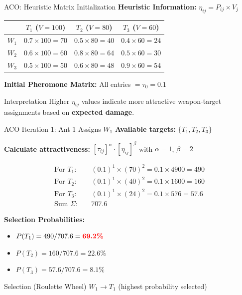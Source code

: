 \documentclass[aspectratio=43,8pt]{beamer}
\begin{document}
\begin{frame}{ACO: Heuristic Matrix Initialization}
\textbf{Heuristic Information:} $\eta_{ij} = P_{ij} \times V_j$

\vspace{0.3cm}
\begin{table}[h]
\centering
\begin{tabular}{c|ccc}
\toprule
& $T_1$ ($V=100$) & $T_2$ ($V=80$) & $T_3$ ($V=60$) \\
\midrule
$W_1$ & $0.7 \times 100 = 70$ & $0.5 \times 80 = 40$ & $0.4 \times 60 = 24$ \\
$W_2$ & $0.6 \times 100 = 60$ & $0.8 \times 80 = 64$ & $0.5 \times 60 = 30$ \\
$W_3$ & $0.5 \times 100 = 50$ & $0.6 \times 80 = 48$ & $0.9 \times 60 = 54$ \\
\bottomrule
\end{tabular}
\end{table}

\vspace{0.3cm}
\textbf{Initial Pheromone Matrix:} All entries $= \tau_0 = 0.1$

\begin{exampleblock}{Interpretation}
Higher $\eta_{ij}$ values indicate more attractive weapon-target assignments based on \textbf{expected damage}.
\end{exampleblock}
\end{frame}

\begin{frame}{ACO Iteration 1: Ant 1 Assigns $W_1$}
\textbf{Available targets:} $\{T_1, T_2, T_3\}$

\vspace{0.2cm}
\textbf{Calculate attractiveness:} $[\tau_{ij}]^\alpha \cdot [\eta_{ij}]^\beta$ with $\alpha=1$, $\beta=2$

\begin{align*}
\text{For } T_1: & \quad (0.1)^1 \times (70)^2 = 0.1 \times 4900 = 490 \\
\text{For } T_2: & \quad (0.1)^1 \times (40)^2 = 0.1 \times 1600 = 160 \\
\text{For } T_3: & \quad (0.1)^1 \times (24)^2 = 0.1 \times 576 = 57.6 \\
\text{Sum } \Sigma: & \quad 707.6
\end{align*}

\textbf{Selection Probabilities:}
\begin{itemize}
    \item $P(T_1) = 490/707.6 = \textcolor{red}{\textbf{69.2\%}}$
    \item $P(T_2) = 160/707.6 = 22.6\%$
    \item $P(T_3) = 57.6/707.6 = 8.1\%$
\end{itemize}

\begin{alertblock}{Selection (Roulette Wheel)}
$W_1 \to T_1$ (highest probability selected)
\end{alertblock}
\end{frame}
\end{document}
